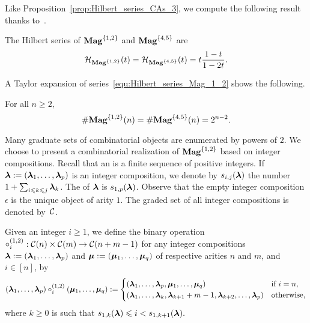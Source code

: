 Like Proposition~\ref{prop:Hilbert_series_CAs_3}, we compute the
following result thanks to~\cite{Gir18}.
\medbreak

\begin{Theorem} \label{thm:Hilbert_series_Mag_1_2}
    The Hilbert series of $\mathbf{Mag}^{\{1, 2\}}$ and $\mathbf{Mag}^{\{4, 5\}}$ are
    \begin{equation} \label{equ:Hilbert_series_Mag_1_2}
        \mathcal{H}_{\mathbf{Mag}^{\{1, 2\}}}(t)
        = \mathcal{H}_{\mathbf{Mag}^{\{4, 5\}}}(t) =
        t \frac{1 - t}{1 - 2t}.
    \end{equation}
\end{Theorem}
\medbreak

A Taylor expansion of series~\eqref{equ:Hilbert_series_Mag_1_2} shows
the following.
\medbreak

\begin{Proposition} \label{prop:Close_formula_Mag_1_2}
    For all $n \geq 2,$
    \begin{equation} \label{equ:Close_formula_Mag_1_2}
        \# \mathbf{Mag}^{\{1, 2\}}(n) = \# \mathbf{Mag}^{\{4, 5\}}(n) = 2^{n-2}.
    \end{equation}
\end{Proposition}
\medbreak

Many graduate sets of combinatorial objects are enumerated by powers of
$2$. We choose to present a combinatorial realization of
$\mathbf{Mag}^{\{1, 2\}}$ based on integer compositions. Recall that an
 is a finite sequence of positive integers. If
$\bm{\lambda} := \left(\bm{\lambda}_1, \dots, \bm{\lambda}_p\right)$ is an integer
composition, we denote by $s_{i, j}(\bm{\lambda})$ the number
$1 + \sum_{i \leqslant k \leqslant j} \bm{\lambda}_k$. The  of $\bm{\lambda}$
is $s_{1, p}(\bm{\lambda})$. Observe that the empty integer composition
$\epsilon$ is the unique object of arity $1$. The graded set of all
integer compositions is denoted by~$\mathcal{C}$.
\medbreak

Given an integer $i \geq 1$, we define the binary operation
\begin{math}
    \circ_i^{(1,2)} : \mathcal{C}(n) \times \mathcal{C}(m)
    \to\mathcal{C}(n + m - 1)
\end{math}
for any integer compositions
$\bm{\lambda} := \left(\bm{\lambda}_1, \dots, \bm{\lambda}_p\right)$ and
$\bm{\mu} := \left(\bm{\mu}_1, \dots, \bm{\mu}_q\right)$ of respective arities $n$
and $m$, and $i \in [n]$, by
\begin{equation}
    \left(\bm{\lambda}_1, \dots, \bm{\lambda}_p\right)
    \circ_i^{(1,2)}
    \left(\bm{\mu}_1, \dots, \bm{\mu}_q\right)
    :=
    \begin{cases}
        \left(\bm{\lambda}_1, \dots, \bm{\lambda}_p,
        \bm{\mu}_1, \dots, \bm{\mu}_q\right) &
        \mbox{if } i = n, \\
        \left(\bm{\lambda}_1, \dots, \bm{\lambda}_k, \bm{\lambda}_{k + 1} + m - 1,
        \bm{\lambda}_{k + 2}, \dots, \bm{\lambda}_p\right)
            & \mbox{otherwise},
    \end{cases}
\end{equation}
where $k \geq 0$ is such that
\begin{math}
    s_{1, k}(\bm{\lambda}) \leqslant i < s_{1, k + 1}(\bm{\lambda}).
\end{math}
\medbreak

